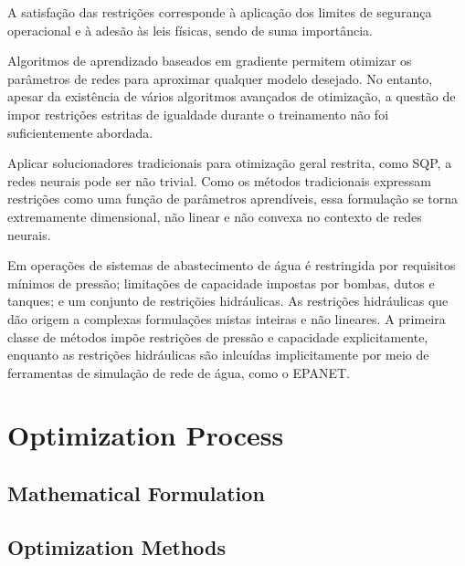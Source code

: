 A satisfação das restrições corresponde à aplicação dos limites de segurança operacional e à adesão às leis físicas, sendo de suma importância\cite{rfc15}.

Algoritmos de aprendizado baseados em gradiente permitem otimizar os parâmetros de redes para aproximar qualquer modelo desejado. No entanto, apesar da existência de vários algoritmos avançados de otimização, a questão de impor restrições estritas de igualdade durante o treinamento não foi suficientemente abordada\cite{rfc10}.

Aplicar solucionadores tradicionais para otimização geral restrita, como SQP\cite{rfc18}, a redes neurais pode ser não trivial. Como os métodos tradicionais expressam restrições como uma função de parâmetros aprendíveis, essa formulação se torna extremamente dimensional, não linear e não convexa no contexto de redes neurais\cite{rfc10}.

Em operações de sistemas de abastecimento de água é restringida por requisitos mínimos de pressão; limitações de capacidade impostas por bombas, dutos e tanques; e um conjunto de restriçõies hidráulicas. As restrições hidráulicas que dão origem a complexas formulações mistas inteiras e não lineares. A primeira classe de métodos impõe restrições de pressão e capacidade explicitamente, enquanto as restrições hidráulicas são inlcuídas implicitamente por meio de ferramentas de simulação de rede de água, como o EPANET. \cite{rfc17}

\section{Optimization Process}

\subsection{Mathematical Formulation}

\subsection{Optimization Methods}

